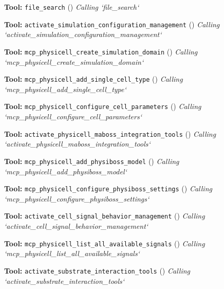 \documentclass[11pt,a4paper]{article}
\begin{document}
\begin{toolokbox}
\textbf{Tool:} \texttt{file\_search} (\checkmark)
\textit{Calling `file\_search`}
\end{toolokbox}
\begin{toolokbox}
\textbf{Tool:} \texttt{activate\_simulation\_configuration\_management} (\checkmark)
\textit{Calling `activate\_simulation\_configuration\_management`}
\end{toolokbox}
\begin{toolokbox}
\textbf{Tool:} \texttt{mcp\_physicell\_create\_simulation\_domain} (\checkmark)
\textit{Calling `mcp\_physicell\_create\_simulation\_domain`}
\end{toolokbox}
\begin{toolokbox}
\textbf{Tool:} \texttt{mcp\_physicell\_add\_single\_cell\_type} (\checkmark)
\textit{Calling `mcp\_physicell\_add\_single\_cell\_type`}
\end{toolokbox}
\begin{toolokbox}
\textbf{Tool:} \texttt{mcp\_physicell\_configure\_cell\_parameters} (\checkmark)
\textit{Calling `mcp\_physicell\_configure\_cell\_parameters`}
\end{toolokbox}
\begin{toolokbox}
\textbf{Tool:} \texttt{activate\_physicell\_maboss\_integration\_tools} (\checkmark)
\textit{Calling `activate\_physicell\_maboss\_integration\_tools`}
\end{toolokbox}
\begin{toolokbox}
\textbf{Tool:} \texttt{mcp\_physicell\_add\_physiboss\_model} (\checkmark)
\textit{Calling `mcp\_physicell\_add\_physiboss\_model`}
\end{toolokbox}
\begin{toolokbox}
\textbf{Tool:} \texttt{mcp\_physicell\_configure\_physiboss\_settings} (\checkmark)
\textit{Calling `mcp\_physicell\_configure\_physiboss\_settings`}
\end{toolokbox}
\begin{toolokbox}
\textbf{Tool:} \texttt{activate\_cell\_signal\_behavior\_management} (\checkmark)
\textit{Calling `activate\_cell\_signal\_behavior\_management`}
\end{toolokbox}
\begin{toolokbox}
\textbf{Tool:} \texttt{mcp\_physicell\_list\_all\_available\_signals} (\checkmark)
\textit{Calling `mcp\_physicell\_list\_all\_available\_signals`}
\end{toolokbox}
\begin{toolokbox}
\textbf{Tool:} \texttt{activate\_substrate\_interaction\_tools} (\checkmark)
\textit{Calling `activate\_substrate\_interaction\_tools`}
\end{toolokbox}
\end{document}
